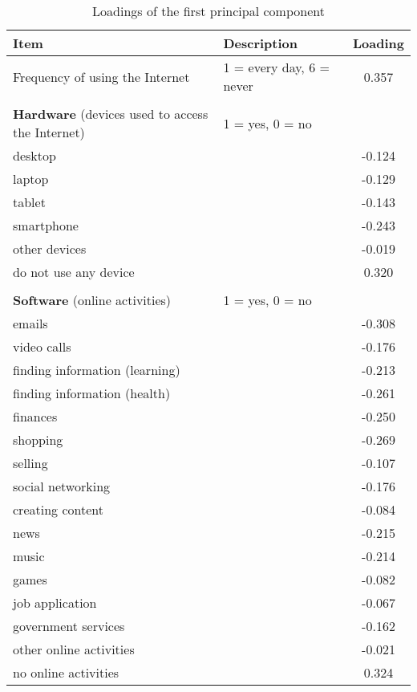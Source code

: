 \documentclass[12pt]{article}
\begin{document}
    \begin{table}[h!]
        \centering
        \caption{Loadings of the first principal component}
        \label{tab:pc1_loadings_q2}
        \begin{tabular}{llc}
            \toprule
            Item & Description & Loading \\
            \midrule
            Frequency of using the Internet & 1 = every day, 6 = never & 0.357 \\
            & & \\
            \textbf{Hardware} (devices used to access the Internet) & 1 = yes, 0 = no & \\
            desktop &  & -0.124 \\
            laptop &  & -0.129 \\
            tablet &  & -0.143 \\
            smartphone &  & -0.243 \\
            other devices &  & -0.019 \\
            do not use any device &  & 0.320 \\
            & & \\
            \textbf{Software} (online activities) & 1 = yes, 0 = no & \\
            emails &  & -0.308 \\
            video calls &  & -0.176 \\
            finding information (learning) &  & -0.213 \\
            finding information (health) &  & -0.261 \\
            finances &  & -0.250 \\
            shopping &  & -0.269 \\
            selling &  & -0.107 \\
            social networking &  & -0.176 \\
            creating content &  & -0.084 \\
            news &  & -0.215 \\
            music &  & -0.214 \\
            games &  & -0.082 \\
            job application &  & -0.067 \\
            government services &  & -0.162 \\
            other online activities &  & -0.021 \\
            no online activities &  & 0.324 \\
            \bottomrule
        \end{tabular}
    \end{table}
\end{document}
